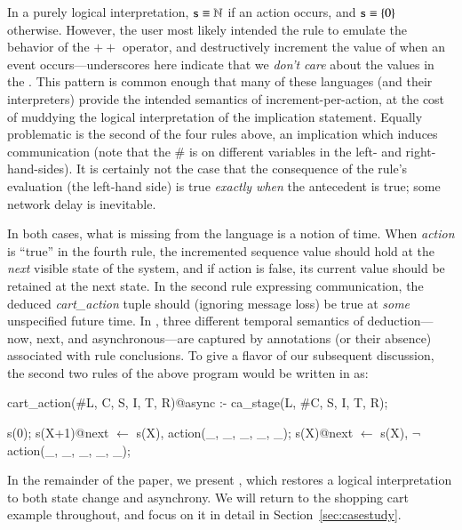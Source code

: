 In a purely logical interpretation, $\dedalus{s} \equiv \mathbb{N}$ if an
action occurs, and $\dedalus{s} \equiv \{0\}$ otherwise.  However,
the user most likely intended the  rule to emulate the behavior of
the $++$ operator, and destructively increment the value of  when
an  event occurs---underscores here indicate that we {\em don't care} about the values in the .
This pattern is common enough
that many of these languages (and their interpreters) provide the intended semantics of increment-per-action, at the cost of muddying the logical
interpretation of the implication statement.  Equally problematic is the second of the four rules above,
an implication which induces communication (note that the \# is on different variables in the left- and right-hand-sides).  It is certainly not the case that the consequence of the rule's evaluation (the left-hand side) is true {\em exactly when}  the antecedent is true; some network delay is inevitable.

In both cases, what is missing from the language is a notion of time.  When {\em action} is ``true'' in the fourth rule,
the incremented sequence value should
hold at the {\em next} visible state of the system, and if action is false, its current
value should be retained at the next state.  In the second rule expressing communication, 
the deduced {\em cart\_action}
tuple should (ignoring message loss) be true at {\em some} unspecified future time.  In \lang,
three different temporal semantics of deduction---now, next, and asynchronous---are captured by annotations (or their absence) 
associated with rule conclusions.  To give a flavor of our subsequent discussion, the second two rules of the above program would be written in \lang as:

\begin{Dedalus}
cart_action(#L, C, S, I, T, R)@async :-
  ca_stage(L, #C, S, I, T, R);

s(0);
s(X+1)@next \(\leftarrow\)  s(X), action(_, _, _, _, _);
s(X)@next \(\leftarrow\)  s(X), \(\lnot\) action(_, _, _, _, _);
\end{Dedalus}

In the remainder of the paper, we present \lang, which restores a logical interpretation to
both state change and asynchrony.  We will return to the shopping cart example throughout, and focus on it in detail 
in Section~\ref{sec:casestudy}.

